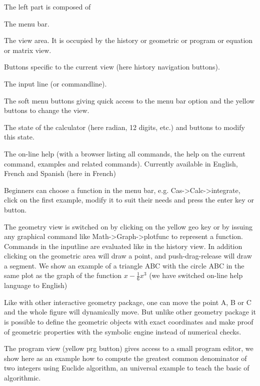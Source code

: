\documentclass{article}
\begin{document}
The left part is composed of
\begin{enumeratenumeric}
  \item The menu bar.
  
  \item The view area. It is occupied by the history or geometric or program
  or equation or matrix view.
  
  \item Buttons specific to the current view (here history navigation
  buttons).
  
  \item The input line (or commandline).
  
  \item The soft menu buttons giving quick access to the menu bar option and
  the yellow buttons to change the view.
  
  \item The state of the calculator (here radian, 12 digits, etc.) and buttons
  to modify this state.
  
  \item The on-line help (with a browser listing all commands, the help on the
  current command, examples and related commands). Currently available in
  English, French and Spanish (here in French)
\end{enumeratenumeric}
Beginners can choose a function in the menu bar, e.g. Cas->Calc->integrate,
click on the first example, modify it to suit their needs and press the enter
key or button.

The geometry view is switched on by clicking on the yellow geo key or by
issuing any graphical command like Math->Graph->plotfunc to represent a
function. Commands in the inputline are evaluated like in the history view. In
addition clicking on the geometric area will draw a point, and
push-drag-release will draw a segment. We show an example of a triangle ABC
with the circle ABC in the same plot as the graph of the function $x -
\frac{1}{6} x^3$ (we have switched on-line help language to English)


Like with other interactive geometry package, one can move the point A, B or C
and the whole figure will dynamically move. But unlike other geometry package
it is possible to define the geometric objects with exact coordinates and make
proof of geometric properties with the symbolic engine instead of numerical
checks.

The program view (yellow prg button) gives access to a small program editor,
we show here as an example how to compute the greatest common denominator of
two integers using Euclide algorithm, an universal example to teach the basic
of algorithmic.
\end{document}
